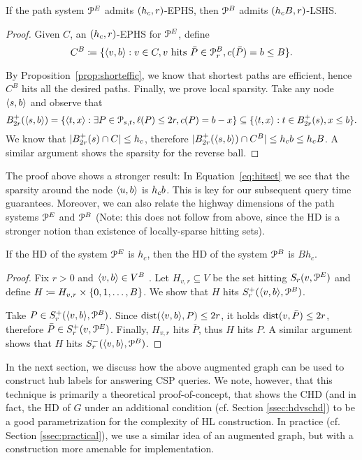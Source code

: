\begin{proposition}
If the path system $\mathcal{P}^E$ admits $(h_c,r)$-EPHS, then $\mathcal{P}^B$ admits $(h_c B,r)$-LSHS.
\end{proposition}
\begin{proof}
Given $C$, an $(h_c,r)$-EPHS for $\mathcal{P}^E$, define
\begin{equation}\label{eq:hitset}
C^B\coloneqq \{\langle v,b\rangle: v\in C, v \text{ hits }\bar P\in\mathcal{P}^B_r, c(\bar P)=b\leq B \}.
\end{equation}

By Proposition~\ref{prop:shorteffic}, we know that shortest paths are efficient, hence $C^B$ hits all the desired paths.
Finally, we prove local sparsity.
Take any node $\langle s,b\rangle$ and observe that
\[
B^+_{2r}(\langle s,b\rangle) = \{\langle t,x\rangle: \exists P\in\mathcal{P}_{s,t}, \ell(P)\leq 2r, c(P)=b-x\} 
\subseteq \{\langle t,x\rangle: t\in B^+_{2r}(s), x\leq b\} .
\]
We know that $\lvert B^+_{2r}(s)\cap C\rvert\leq h_c$, therefore $\lvert B^+_{2r}(\langle s,b\rangle)\cap C^B\rvert\leq h_c b\leq h_c B$.
A similar argument shows the sparsity for the reverse ball.
\end{proof}

The proof above shows a stronger result:
In Equation~\eqref{eq:hitset} we see that the sparsity around the node $\langle u,b\rangle$ is $h_c b$.
This is key for our subsequent query time guarantees.
Moreover, we can also relate the highway dimensions of the path systems $\mathcal{P}^E$ and $\mathcal{P}^B$ (Note: this does not follow from above, since the HD is a stronger notion than existence of locally-sparse hitting sets).
\begin{proposition}\label{prop:HDaugmented}
If the HD of the system $\mathcal{P}^E$ is $h_c$, then the HD of the system $\mathcal{P}^B$ is $Bh_c$.
\end{proposition}
\begin{proof}
Fix $r>0$ and $\langle v,b\rangle\in V^B$ .
Let $H_{v,r}\subseteq V$ be the set hitting $S_r(v,\mathcal{P}^E)$ and define $H\coloneqq H_{v,r}\times\{0,1,\ldots,B\}$.
We show that $H$ hits $S^+_r(\langle v,b\rangle,\mathcal{P}^B)$.

Take $P\in S^+_r(\langle v,b\rangle,\mathcal{P}^B)$.
Since $\mbox{dist}(\langle v,b\rangle,P)\leq 2r$, it holds $\mbox{dist}(v,\bar P)\leq 2r$, therefore $\bar P\in S^+_r(v,\mathcal{P}^E)$.
Finally, $H_{v,r}$ hits $\bar P$, thus $H$ hits $P$.
A similar argument shows that $H$ hits $S^-_r(\langle v,b\rangle,\mathcal{P}^B)$.
\end{proof}

In the next section, we discuss how the above augmented graph can be used to construct hub labels for answering CSP queries. 
We note, however, that this technique is primarily a theoretical proof-of-concept, that shows the CHD (and in fact, the HD of $G$ under an additional condition (cf. Section \ref{ssec:hdvschd}) to be a good parametrization for the complexity of HL construction.
In practice (cf. Section \ref{ssec:practical}), we use a similar idea of an augmented graph, but with a construction more amenable for implementation.